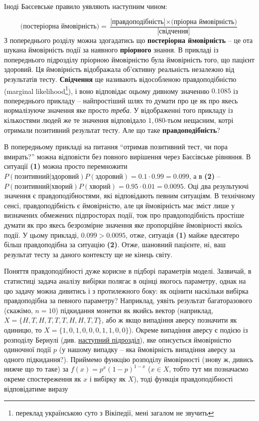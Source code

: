 \documentclass[
  11pt,
]{book}
\begin{document}
Іноді Баєсевське правило уявляють наступним чином:

\[\text{(постеріорна ймовірність)} = \frac{\text{[правдоподібність]} \times \text{(пріорна ймовірність)}}{\text{[свідчення]}}\]
З попереднього розділу можна здогадатись що \textbf{постеріорна ймовірність} -- це ота шукана ймовірність події за наявного \textbf{пріорного} знання. В прикладі із попереднього підрозділу пріорною ймовірністю була ймовірність того, що пацієнт здоровий. Ця ймовірність відображала об'єктивну реальність незалежно від результатів тесту. \textbf{Свідчення} ще називають відособленою правдоподібністю (marginal likelihood\footnote{переклад українською суто з Вікіпедії, мені загалом не звучить}), і воно відповідає оцьому дивному значенню \(0.1085\) із попереднього прикладу -- найпростіший шлях то думати про це як про якесь нормалізуюче значення яке просто \emph{треба}. У відображенні того прикладу із кількостями людей же те значення відповідало \(1,080\)-тьом нещасним, котрі отримали позитивний результат тесту. Але що таке \textbf{правдоподібність}?

В попередньому прикладі на питання ``отримав позитивний тест, чи пора вмирать?'' можна відповісти без повного вирішення через Баєсівське рівняння. В ситуації \textbf{(1)} можна просто перемножити \(P(\text{позитивний|здоровий})P(\text{здоровий}) = 0.1 \cdot 0.99 = 0.099\), а в \textbf{(2)} -- \(P(\text{позитивний|хворий})P(\text{хворий}) = 0.95 \cdot 0.01 = 0.0095\). Оці два результуючі значення є правдоподібностями, які відповідають певним ситуаціям. В технічному сенсі, правдоподібність є ймовірністю, але ця ймовірність має зміст лише у визначених обмежених підпросторах події, тож про правдоподібність простіше думати як про якесь безрозмірне значення яке пропорційне ймовірності якоїсь події. У цьому прикладі, \(0.099 > 0.0095\), отже, ситуація \textbf{(1)} майже вдесятеро більш правдоподібна за ситуацію \textbf{(2)}. Отже, шановний пацієнте, ні, ваш результат тесту за даного контексту ще не кінець світу.

Поняття правдоподібності дуже корисне в підборі параметрів моделі. Зазвичай, в статистиці задача аналізу вибірки полягає в оцінці якогось параметру, однак на цю задачу можна дивитись і з протилежного боку: як оцінити наскільки вибірка правдоподібна за певного параметру? Наприклад, уявіть результат багаторазового (скажімо, \(n = 10\)) підкидання монетки як якийсь вектор (наприклад, \(X = \{H, T, H, T, T, T, H, H, T, T\}\), або ж якщо випадіння аверсу позначити як одиницю, то \(X = \{1, 0, 1, 0, 0, 0, 1, 1, 0, 0\}\)). Окреме випадіння аверсу є подією із розподілу Бернулі (див. \hyperref[pdfs]{наступний підрозділ}), яке описується ймовірністю одиночної події \(p\) (у нашому випадку -- яка ймовірність випадіння аверсу за одного підкидання?). Приймемо функцію розподілу ймовірності (знову ж, дивись нижче що то таке) за \(f(x) = p^x (1-p)^{1-x}\) (\(x \in X\), тобто тут ми позначаємо окреме спостереження як \(x\) і вибірку як \(X\)), тоді функція правдоподібності відповідатиме виразу
\end{document}
